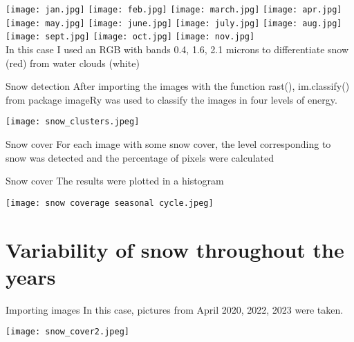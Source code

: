 \documentclass{beamer}
\begin{document}
\begin{frame}
\texttt{[image: jan.jpg]}
 \texttt{[image: feb.jpg]}
 \texttt{[image: march.jpg]}
 \texttt{[image: apr.jpg]}
 \texttt{[image: may.jpg]}
 \texttt{[image: june.jpg]}
 \texttt{[image: july.jpg]}
 \texttt{[image: aug.jpg]}
 \texttt{[image: sept.jpg]}
 \texttt{[image: oct.jpg]}
 \texttt{[image: nov.jpg]} \\
 \tiny{In this case I used an RGB with bands 0.4, 1.6, 2.1 microns to differentiate snow (red) from water clouds (white)}
\end{frame}

\begin{frame}{Snow detection}
    \small{After importing the images with the function rast(), im.classify() from package imageRy was used to classify the images in four levels of energy. }
     
    \texttt{[image: snow\_clusters.jpeg]} 
\end{frame}

\begin{frame}{Snow cover}
    \small{For each image with some snow cover, the level corresponding to snow was detected and the percentage of pixels were calculated}
      
\end{frame}

\begin{frame}{Snow cover}
    \small{The results were plotted in a histogram}
     
   \centering
   \texttt{[image: snow coverage seasonal cycle.jpeg]}
\end{frame}


\section{Variability of snow throughout the years}
\begin{frame}{Importing images}
    \small{In this case, pictures from April 2020, 2022, 2023 were taken.}
     
    \texttt{[image: snow\_cover2.jpeg]}
\end{frame}
\end{document}
